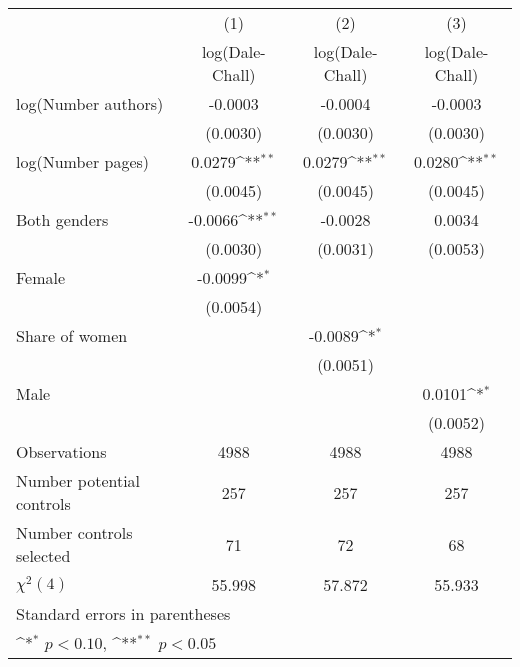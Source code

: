{
\def\sym#1{\ifmmode^{#1}\else\(^{#1}\)\fi}
\begin{tabular}{l*{3}{c}}
\hline\hline
                    &\multicolumn{1}{c}{(1)}&\multicolumn{1}{c}{(2)}&\multicolumn{1}{c}{(3)}\\
                    &\multicolumn{1}{c}{log(Dale-Chall)}&\multicolumn{1}{c}{log(Dale-Chall)}&\multicolumn{1}{c}{log(Dale-Chall)}\\
\hline
\hspace{3mm}log(Number authors)&     -0.0003        &     -0.0004        &     -0.0003        \\
                    &    (0.0030)        &    (0.0030)        &    (0.0030)        \\
[1em]
\hspace{3mm}log(Number pages)&      0.0279\sym{**}&      0.0279\sym{**}&      0.0280\sym{**}\\
                    &    (0.0045)        &    (0.0045)        &    (0.0045)        \\
[1em]
\hspace{3mm}Both genders&     -0.0066\sym{**}&     -0.0028        &      0.0034        \\
                    &    (0.0030)        &    (0.0031)        &    (0.0053)        \\
[1em]
\hspace{3mm}Female  &     -0.0099\sym{*} &                    &                    \\
                    &    (0.0054)        &                    &                    \\
[1em]
\hspace{3mm}Share of women&                    &     -0.0089\sym{*} &                    \\
                    &                    &    (0.0051)        &                    \\
[1em]
\hspace{3mm}Male    &                    &                    &      0.0101\sym{*} \\
                    &                    &                    &    (0.0052)        \\
\hline
Observations        &        4988        &        4988        &        4988        \\
Number potential controls&         257        &         257        &         257        \\
Number controls selected&          71        &          72        &          68        \\
$\chi^2(4)$         &      55.998        &      57.872        &      55.933        \\
\hline\hline
\multicolumn{4}{l}{\footnotesize Standard errors in parentheses}\\
\multicolumn{4}{l}{\footnotesize \sym{*} \(p<0.10\), \sym{**} \(p<0.05\)}\\
\end{tabular}
}
